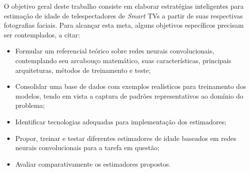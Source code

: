 O objetivo geral deste trabalho consiste em elaborar estratégias inteligentes para estimação de idade de telespectadores de  \emph{Smart} TVs a partir de suas respectivas fotografias faciais. Para alcançar esta meta, alguns objetivos específicos precisam ser contemplados, a citar:

\begin{itemize}
     \item Formular um referencial teórico sobre redes neurais convolucionais, contemplando seu arcabouço matemático, suas características, principais arquiteturas, métodos de treinamento e teste;
     \item Consolidar uma base de dados com exemplos realísticos para treinamento dos modelos, tendo em vista a captura de padrões representativos ao domínio do problema;
     \item Identificar tecnologias adequadas para implementação dos estimadores;
     \item Propor, treinar e testar diferentes estimadores de idade baseados em redes neurais convolucionais para a tarefa em questão;
     \item Avaliar comparativamente os estimadores propostos.
\end{itemize}
